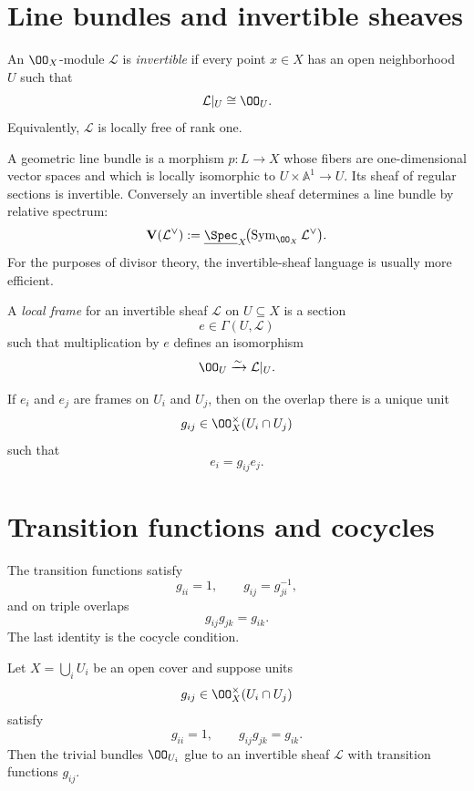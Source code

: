 \section{Line bundles and invertible sheaves}

\begin{definition}\label{def:vi42-invertible-sheaf}
An \(\OO_X\)-module \(\mathcal L\) is \emph{invertible} if every point \(x\in X\) has an open neighborhood \(U\) such that
\[
  \mathcal L|_U\cong\OO_U.
\]
Equivalently, \(\mathcal L\) is locally free of rank one.
\end{definition}

A geometric line bundle is a morphism \(p:L\to X\) whose fibers are one-dimensional vector spaces and which is locally isomorphic to \(U\times\mathbb A^1\to U\).  Its sheaf of regular sections is invertible.  Conversely an invertible sheaf determines a line bundle by relative spectrum:
\[
  \mathbf V(\mathcal L^\vee)
  :=
  \underline{\Spec}_X\!\bigl(\operatorname{Sym}_{\OO_X}\mathcal L^\vee\bigr).
\]
For the purposes of divisor theory, the invertible-sheaf language is usually more efficient.

\begin{definition}\label{def:vi42-local-frame}
A \emph{local frame} for an invertible sheaf \(\mathcal L\) on \(U\subseteq X\) is a section
\[
  e\in\Gamma(U,\mathcal L)
\]
such that multiplication by \(e\) defines an isomorphism
\[
  \OO_U\xrightarrow{\sim}\mathcal L|_U.
\]
\end{definition}

If \(e_i\) and \(e_j\) are frames on \(U_i\) and \(U_j\), then on the overlap there is a unique unit
\[
  g_{ij}\in\OO_X^\times(U_i\cap U_j)
\]
such that
\[
  e_i=g_{ij}e_j.
\]

\section{Transition functions and cocycles}

The transition functions satisfy
\[
  g_{ii}=1,\qquad
  g_{ij}=g_{ji}^{-1},
\]
and on triple overlaps
\[
  g_{ij}g_{jk}=g_{ik}.
\]
The last identity is the cocycle condition.

\begin{theorem}\label{thm:vi42-gluing}
Let \(X=\bigcup_i U_i\) be an open cover and suppose units
\[
  g_{ij}\in\OO_X^\times(U_i\cap U_j)
\]
satisfy
\[
  g_{ii}=1,\qquad g_{ij}g_{jk}=g_{ik}.
\]
Then the trivial bundles \(\OO_{U_i}\) glue to an invertible sheaf \(\mathcal L\) with transition functions \(g_{ij}\).
\end{theorem}

